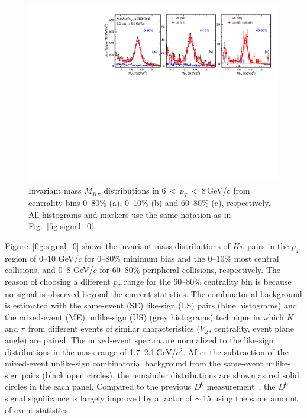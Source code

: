 \documentclass[%
 reprint,	
 amsmath,amssymb,
 aps,
 prc,
]{revtex4-1}
\begin{document}
\begin{figure}
\centering
\includegraphics[width=1.0\textwidth]{fig/signal_6_8GeV.pdf}
\caption{Invariant mass $M_{K\pi}$ distributions in 6\,$<$\,$p_{T}$\,$<$\,8\,GeV/$c$ from centrality bins 0--80\% (a), 0--10\% (b) and 60--80\% (c), respectively. All histograms and markers use the same notation as in Fig.~\ref{fig:signal_0}.}
\label{fig:signal_2} 
\end{figure}

Figure~\ref{fig:signal_0} shows the invariant mass distributions of $K\pi$ pairs in the $p_{T}$ region of 0--10 GeV/$c$ for 0--80\% minimum bias and the 0--10\% most central collisions, and 0--8 GeV/$c$ for 60--80\% peripheral collisions, respectively. The reason of choosing a different $p_T$ range for the 60--80\% centrality bin is because no signal is observed beyond the current statistics. The combinatorial background is estimated with the same-event (SE) like-sign (LS) pairs (blue histograms) and the mixed-event (ME) unlike-sign (US) (grey histograms) technique in which $K$ and $\pi$ from different events of similar characteristics ($V_{Z}$, centrality, event plane angle) are paired. The mixed-event spectra are normalized to the like-sign distributions in the mass range of 1.7--2.1\,GeV/$c^2$. After the subtraction of the mixed-event unlike-sign combinatorial background from the same-event unlike-sign pairs (black open circles), the remainder distributions are shown as red solid circles in the each panel. Compared to the previous $D^0$ measurement~\cite{Star_D_RAA}, the $D^0$ signal significance is largely improved by a factor of $\sim$\,15 using the same amount of event statistics. 
\end{document}
